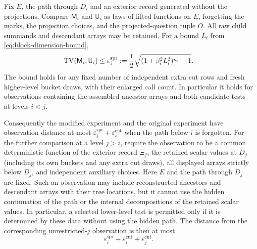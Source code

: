\begin{lemma}\label{lem:sparse-tv}
Fix $E$, the path through $D_i$ and an exterior record generated without the
projections.  Compare $\mathsf M_i$ and $\mathsf U_i$ as laws of lifted
functions on $E$, forgetting the marks, the projection choices, and the
projected-question tuple $O$.  All raw child summands and descendant arrays
may be retained.  For a bound $L_i$ from
\eqref{eq:block-dimension-bound},
\begin{equation}\label{eq:sparse-tv-bound}
 \operatorname{TV}(\mathsf M_i,\mathsf U_i)
 \le \varepsilon_i^{\mathrm{spr}}
 :=\frac12\sqrt{(1+\beta_i^2L_i^2)^{n_i}-1}.
\end{equation}
The bound holds for any fixed number of independent extra cut rows and fresh
higher-level bucket draws, with their enlarged call count.  In particular it
holds for observations containing the assembled ancestor arrays and both
candidate tests at levels $i<j$.

Consequently the modified experiment and the original experiment have
observation distance at most
$\varepsilon_i^{\mathrm{spr}}+\varepsilon_i^{\mathrm{cut}}$
when the path below $i$ is forgotten.  For the further comparison at a level
$j>i$, require the observation to be a common deterministic function of the
exterior record $\Xi_j$, the retained scalar values at $D_j$ (including its
own buckets and any extra cut draws), all displayed arrays strictly below
$D_j$, and independent auxiliary choices.  Here $E$ and the path through
$D_j$ are fixed.  Such an observation may include reconstructed ancestors
and descendant arrays with their tree locations, but it cannot use the
hidden continuation of the path or the internal decompositions of the
retained scalar values.  In particular, a selected lower-level test is
permitted only if it is determined by these data without using the hidden
path.  The distance from the corresponding unrestricted-$j$ observation is
then at most
\begin{equation}\label{eq:two-cut-triangle}
 \varepsilon_i^{\mathrm{spr}}+
 \varepsilon_i^{\mathrm{cut}}+\varepsilon_j^{\mathrm{cut}}.
\end{equation}
\end{lemma}

